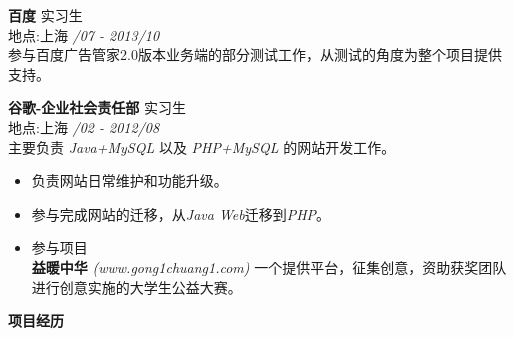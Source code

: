 \documentclass[a4paper]{article}
\newenvironment{changemargin}[2]{%
  \begin{list}{}{%
    \setlength{\topsep}{0pt}%
    \setlength{\leftmargin}{#1}%
    \setlength{\rightmargin}{#2}%
    \setlength{\listparindent}{\parindent}%
    \setlength{\itemindent}{\parindent}%
    \setlength{\parsep}{\parskip}%
  }%
  \item[]}{\end{list}
}
\newcommand{\lineover}{
	\begin{changemargin}{-0.05in}{-0.05in}
		\vspace*{-8pt}
		\hrulefill \\
		\vspace*{-2pt}
	\end{changemargin}
}
\newcommand{\header}[1]{
	\begin{changemargin}{-0.5in}{-0.5in}
		\scshape{\textbf{#1}}\\
	\end{changemargin}
}
\newenvironment{body} {
	\vspace*{-16pt}
	\begin{changemargin}{-0.25in}{-0.5in}
  }	
	{\end{changemargin}
}
\begin{document}
\begin{body}
	\vspace{14pt}
	\textbf{百度} \hfill 实习生\\ 
	地点:上海 \hfill \emph{/07 - 2013/10}\\ 
	参与百度广告管家2.0版本业务端的部分测试工作，从测试的角度为整个项目提供支持。
	
	\vspace{6pt}
	\textbf{谷歌-企业社会责任部} \hfill 实习生\\ 
	地点:上海 \hfill \emph{/02 - 2012/08}\\ 
	主要负责 \emph{\fontarial Java+MySQL} 以及 \emph{\fontarial PHP+MySQL} 的网站开发工作。\\ 
	\vspace*{-6pt}
	\begin{itemize} \itemsep -0pt  %
		\item 负责网站日常维护和功能升级。\\
	\end{itemize}
	\vspace*{-12pt}
	\begin{itemize} \itemsep -0pt  %
		\item 参与完成网站的迁移，从\emph{\fontarial Java Web}迁移到\emph{\fontarial PHP}。\\
	\end{itemize}
	\vspace*{-12pt}
	\begin{itemize} \itemsep -0pt  %
		\item 参与项目\\
		\textbf{益暖中华} \emph{\fontarial(www.gong1chuang1.com)} 一个提供平台，征集创意，资助获奖团队进行创意实施的大学生公益大赛。\\
	\end{itemize}
\end{body}

\medskip

\header{项目经历}
\end{document}
